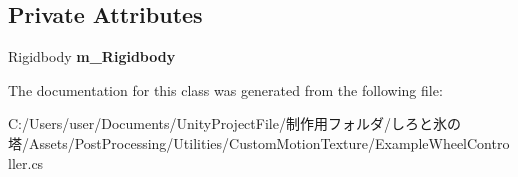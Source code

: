 \subsection*{Private Attributes}
\begin{DoxyCompactItemize}
\item 
\mbox{\label{class_example_wheel_controller_adbc25cd256fbb3c3f77cd7d58538c5f5}} 
Rigidbody {\bfseries m\+\_\+\+Rigidbody}
\end{DoxyCompactItemize}


The documentation for this class was generated from the following file\+:\begin{DoxyCompactItemize}
\item 
C\+:/\+Users/user/\+Documents/\+Unity\+Project\+File/制作用フォルダ/しろと氷の塔/\+Assets/\+Post\+Processing/\+Utilities/\+Custom\+Motion\+Texture/Example\+Wheel\+Controller.\+cs\end{DoxyCompactItemize}
